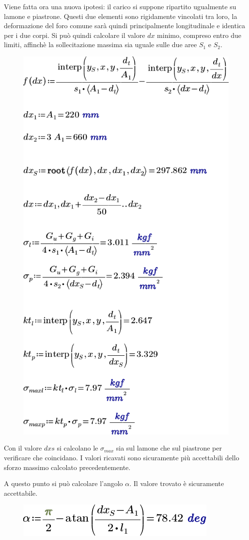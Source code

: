 Viene fatta ora una nuova ipotesi: il carico si suppone ripartito ugualmente su lamone e piastrone. 
Questi due elementi sono rigidamente vincolati tra loro, la deformazione del foro comune sarà quindi principalmente longitudinale e identica per i due corpi.
Si può quindi calcolare il valore $dx$ minimo, compreso entro due limiti, affinchè la sollecitazione massima sia uguale sulle due aree $S_1$ e $S_2$.
\begin{figure}[H]
\centering
  \includegraphics[width=.45\textwidth]{imgs/MathLP4}
\caption{}
\label{fig:MathLP4}
\end{figure}
Con il valore $dxs$ si calcolano le $\sigma_{max}$ sia sul lamone che sul piastrone per verificare che coincidano.
I valori ricavati sono sicuramente più accettabili dello sforzo massimo calcolato precedentemente. 

A questo punto si può calcolare l'angolo $\alpha$.
Il valore trovato è sicuramente accettabile.
\begin{figure}[H]
\centering
  \includegraphics[width=.3\textwidth]{imgs/MathLP5}
\caption{}
\label{fig:MathLP5}
\end{figure}
\clearpage

